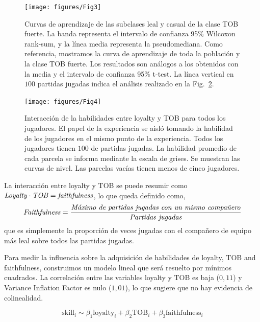 \documentclass[a4paper,11pt]{book}
\theoremstyle{definition}
\begin{document}
\begin{figure}[ht!]
\centering
\texttt{[image: figures/Fig3]}
\caption{
Curvas de aprendizaje de las subclases leal y casual de la clase TOB fuerte.
%
La banda representa el intervalo de confianza 95\% Wilcoxon rank-sum, y la línea media representa la pseudomediana.
%
Como referencia, mostramos la curva de aprendizaje de toda la población y la clase TOB fuerte.
%
Los resultados son análogos a los obtenidos con la media y el intervalo de confianza 95\% t-test.
%
La línea vertical en $100$ partidas jugadas indica el análisis realizado en la Fig.~\protect\ref{skillModels_loyaltyTeamOriented_imageEmpirical}.
}
\label{learningskill_pteam89_ployal}
\end{figure}

\begin{figure}[ht!]
\centering
\texttt{[image: figures/Fig4]}
\caption{
Interacción de la habilidades entre loyalty y TOB para todos los jugadores.
%
El papel de la experiencia se aisló tomando la habilidad de los jugadores en el mismo punto de la experiencia.
%
Todos los jugadores tienen $100$ de partidas jugadas.
%
La habilidad promedio de cada parcela se informa mediante la escala de grises.
%
Se muestran las curvas de nivel.
%
Las parcelas vacías tienen menos de cinco jugadores.
}
\label{skillModels_loyaltyTeamOriented_imageEmpirical}
\end{figure}

La interacción entre loyalty y TOB se puede resumir como $ \text{\emph{Loyalty}} \cdot \text{\emph{TOB}} = \text{\emph{faithfulness}}$, lo que queda definido como,
%
\begin{equation}
\text{\emph{Faithfulness}} = \frac{\text{\emph{Máximo de partidas jugadas con un mismo compañero}}}{\text{\emph{Partidas jugadas}}}
\end{equation}
%
que es simplemente la proporción de veces jugadas con el compañero de equipo más leal sobre todos las partidas jugadas.


Para medir la influencia sobre la adquisición de habilidades de loyalty, TOB and faithfulness, construimos un modelo lineal que será resuelto por mínimos cuadrados.
%
La correlación entre las variables loyalty y TOB es baja ($0,11$) y Variance Inflation Factor es nulo ($1,01$), lo que sugiere que no hay evidencia de colinealidad.

\begin{equation}
\text{skill}_i \sim \beta_1\text{loyalty}_i + \beta_2\text{TOB}_i + \beta_3\text{faithfulness}_i
\end{equation}
\end{document}
